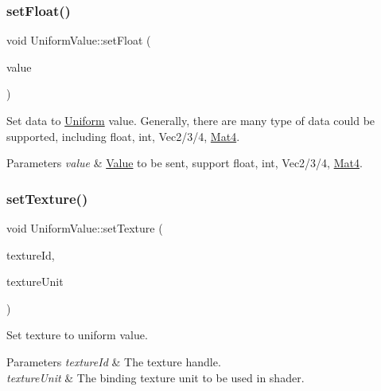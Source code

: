 \subsubsection{\texorpdfstring{set\+Float()}{setFloat()}\hspace{0.1cm}{\footnotesize\ttfamily [2/2]}}
{\footnotesize\ttfamily void Uniform\+Value\+::set\+Float (\begin{DoxyParamCaption}\item[{float}]{value }\end{DoxyParamCaption})}

Set data to \hyperlink{structUniform}{Uniform} value. Generally, there are many type of data could be supported, including float, int, Vec2/3/4, \hyperlink{classMat4}{Mat4}. 
\begin{DoxyParams}{Parameters}
{\em value} & \hyperlink{classValue}{Value} to be sent, support float, int, Vec2/3/4, \hyperlink{classMat4}{Mat4}. \\
\hline
\end{DoxyParams}
\mbox{\label{classUniformValue_a2782110b6651c0e201e6a7c85416f58b}} 
\subsubsection{\texorpdfstring{set\+Texture()}{setTexture()}\hspace{0.1cm}{\footnotesize\ttfamily [1/3]}}
{\footnotesize\ttfamily void Uniform\+Value\+::set\+Texture (\begin{DoxyParamCaption}\item[{G\+Luint}]{texture\+Id,  }\item[{G\+Luint}]{texture\+Unit }\end{DoxyParamCaption})}

Set texture to uniform value. 
\begin{DoxyParams}{Parameters}
{\em texture\+Id} & The texture handle. \\
\hline
{\em texture\+Unit} & The binding texture unit to be used in shader. \\
\hline
\end{DoxyParams}
\mbox{\label{classUniformValue_ad8c2b6a8a18332ac20051e29a4ac72c6}} 
